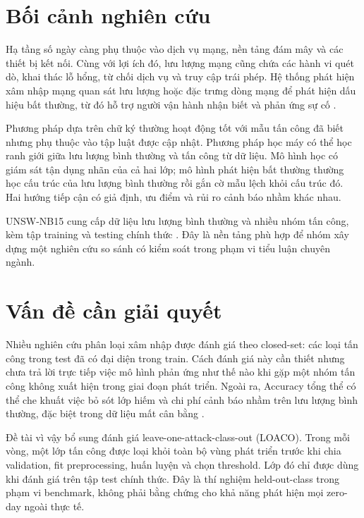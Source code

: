 \documentclass[12pt,a4paper,oneside]{report}
\newcommand{\methodname}{leave-one-attack-class-out}
\begin{document}
\section{Bối cảnh nghiên cứu}

Hạ tầng số ngày càng phụ thuộc vào dịch vụ mạng, nền tảng đám mây và các thiết bị kết nối. Cùng với lợi ích đó, lưu lượng mạng cũng chứa các hành vi quét dò, khai thác lỗ hổng, từ chối dịch vụ và truy cập trái phép. Hệ thống phát hiện xâm nhập mạng quan sát lưu lượng hoặc đặc trưng dòng mạng để phát hiện dấu hiệu bất thường, từ đó hỗ trợ người vận hành nhận biết và phản ứng sự cố \cite{nist80094}.

Phương pháp dựa trên chữ ký thường hoạt động tốt với mẫu tấn công đã biết nhưng phụ thuộc vào tập luật được cập nhật. Phương pháp học máy có thể học ranh giới giữa lưu lượng bình thường và tấn công từ dữ liệu. Mô hình học có giám sát tận dụng nhãn của cả hai lớp; mô hình phát hiện bất thường thường học cấu trúc của lưu lượng bình thường rồi gắn cờ mẫu lệch khỏi cấu trúc đó. Hai hướng tiếp cận có giả định, ưu điểm và rủi ro cảnh báo nhầm khác nhau.

UNSW-NB15 cung cấp dữ liệu lưu lượng bình thường và nhiều nhóm tấn công, kèm tập training và testing chính thức \cite{moustafa2015,moustafa2016,unswsite}. Đây là nền tảng phù hợp để nhóm xây dựng một nghiên cứu so sánh có kiểm soát trong phạm vi tiểu luận chuyên ngành.

\section{Vấn đề cần giải quyết}

Nhiều nghiên cứu phân loại xâm nhập được đánh giá theo closed-set: các loại tấn công trong test đã có đại diện trong train. Cách đánh giá này cần thiết nhưng chưa trả lời trực tiếp việc mô hình phản ứng như thế nào khi gặp một nhóm tấn công không xuất hiện trong giai đoạn phát triển. Ngoài ra, Accuracy tổng thể có thể che khuất việc bỏ sót lớp hiếm và chi phí cảnh báo nhầm trên lưu lượng bình thường, đặc biệt trong dữ liệu mất cân bằng \cite{saito2015}.

Đề tài vì vậy bổ sung đánh giá \methodname{} (LOACO). Trong mỗi vòng, một lớp tấn công được loại khỏi toàn bộ vùng phát triển trước khi chia validation, fit preprocessing, huấn luyện và chọn threshold. Lớp đó chỉ được dùng khi đánh giá trên tập test chính thức. Đây là thí nghiệm held-out-class trong phạm vi benchmark, không phải bằng chứng cho khả năng phát hiện mọi zero-day ngoài thực tế.
\end{document}
